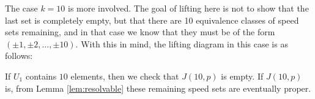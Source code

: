 \documentclass[11pt]{amsart}
\theoremstyle{definition}
\theoremstyle{remark}
\begin{document}
The case $k=10$ is more involved. The goal of lifting here is not to show that the last set is completely empty, 
but that there are 10 equivalence classes of speed sets remaining, and in that case we know that they must be of the form
$(\pm1,\pm2,\ldots,\pm10)$. With this in mind, the lifting diagram in this case is as follows:
\begin{center}
\end{center}

If $U_1$ contains $10$ elements, then we check that $J(10,p)$ is empty. 
If $J(10,p)$ is, from Lemma \ref{lem:resolvable} these remaining speed sets are eventually proper.
\end{document}
